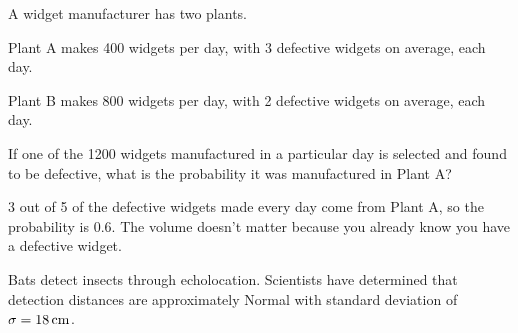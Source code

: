 \documentclass[letterpaper, landscape]{exam}
\begin{document}
\begin{questions}

    \question[5] A widget manufacturer has two plants. 
    
    \begin{itemize*}
      \item Plant A makes 400 widgets per day, with 3 defective widgets on
        average, each day.
      \item Plant B makes 800 widgets per day, with 2 defective widgets on
        average, each day.
    \end{itemize*}

    If one of the 1200 widgets manufactured in a particular day is selected and
    found to be defective, what is the probability it was manufactured in Plant
    A\@?

    \begin{solution}
      3 out of 5 of the defective widgets made every day come from Plant A, so
      the probability is 0.6. The volume doesn't matter because you already know
      you have a defective widget.
    \end{solution}

    \newpage

    \question{}
      Bats detect insects through echolocation. Scientists have determined that
      detection distances are approximately Normal with standard deviation
      of $\sigma = \unit[18]{cm}$.


\end{questions}
\end{document}
